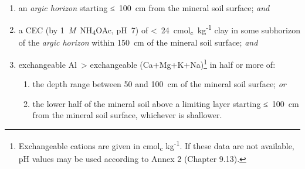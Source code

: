 \documentclass[
  letterpaper,
  DIV=11,
  numbers=noendperiod]{scrreprt}
\providecommand{\tightlist}{%
  \setlength{\itemsep}{0pt}\setlength{\parskip}{0pt}}\usepackage{longtable,booktabs,array}
\begin{document}
\begin{enumerate}
\def\labelenumi{\arabic{enumi}.}
\tightlist
\item
  an \emph{argic horizon} starting ≤~100~cm from the mineral soil
  surface; \emph{and}
\item
  a CEC (by 1~\emph{M}~NH\textsubscript{4}OAc, pH~7) of
  \textless~24~cmol\textsubscript{c}~kg\textsuperscript{-1} clay in some
  subhorizon of the \emph{argic horizon} within 150~cm of the mineral
  soil surface; \emph{and}
\item
  exchangeable Al~\textgreater{} exchangeable (Ca+Mg+K+Na)\footnote{Exchangeable
    cations are given in cmol\textsubscript{c} kg\textsuperscript{-1}.
    If these data are not available, pH values may be used according to
    Annex 2 (Chapter 9.13).} in half or more of:

  \begin{enumerate}
  \def\labelenumii{\alph{enumii}.}
  \tightlist
  \item
    the depth range between 50 and 100~cm of the mineral soil surface;
    \emph{or}
  \item
    the lower half of the mineral soil above a limiting layer starting
    ≤~100~cm from the mineral soil surface, whichever is shallower.
  \end{enumerate}
\end{enumerate}
\end{document}
